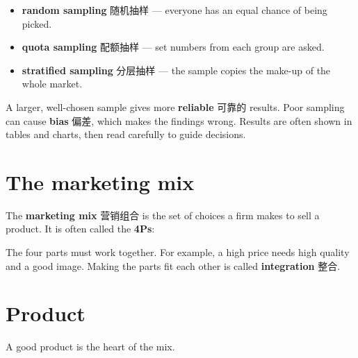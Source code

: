 \documentclass[11pt]{article}
\begin{document}
\begin{itemize}
\item \textbf{random sampling} 随机抽样 — everyone has an equal chance of being picked.

\item \textbf{quota sampling} 配额抽样 — set numbers from each group are asked.

\item \textbf{stratified sampling} 分层抽样 — the sample copies the make-up of the whole market.

\end{itemize}

A larger, well-chosen sample gives more \textbf{reliable} 可靠的 results. Poor sampling can cause \textbf{bias} 偏差, which makes the findings wrong. Results are often shown in tables and charts, then read carefully to guide decisions.

\section*{The marketing mix}

The \textbf{marketing mix} 营销组合 is the set of choices a firm makes to sell a product. It is often called the \textbf{4Ps}:

\begin{center}
\end{center}

The four parts must work together. For example, a high price needs high quality and a good image. Making the parts fit each other is called \textbf{integration} 整合.

\section*{Product}

A good product is the heart of the mix.
\end{document}
